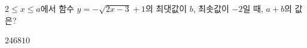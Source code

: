 \hspace*{2mm}\begin{minipage}[t]{\dimexpr\linewidth-2mm\relax}\vspace{0pt}
$2\le x\le a$에서 함수 $y=-\sqrt{2x-3}+1$의 최댓값이 $b$, 최솟값이 $-2$일 때, $a+b$의 값은? 
\begin{choices32}{$2$}{$4$}{$6$}{$8$}{$10$}\end{choices32}\end{minipage}
